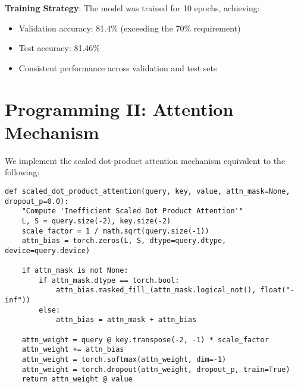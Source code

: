 \documentclass[11pt, a4paper, oneside]{memoir}
\begin{document}
\textbf{Training Strategy}: The model was trained for 10 epochs, achieving:
\begin{itemize}
    \item Validation accuracy: 81.4\% (exceeding the 70\% requirement)
    \item Test accuracy: 81.46\%
    \item Consistent performance across validation and test sets
\end{itemize}

\chapter{Programming II: Attention Mechanism}
We implement the scaled dot-product attention mechanism equivalent to the following:
\begin{verbatim}
def scaled_dot_product_attention(query, key, value, attn_mask=None, dropout_p=0.0):
    "Compute 'Inefficient Scaled Dot Product Attention'"
    L, S = query.size(-2), key.size(-2)
    scale_factor = 1 / math.sqrt(query.size(-1))
    attn_bias = torch.zeros(L, S, dtype=query.dtype, device=query.device)

    if attn_mask is not None:
        if attn_mask.dtype == torch.bool:
            attn_bias.masked_fill_(attn_mask.logical_not(), float("-inf"))
        else:
            attn_bias = attn_mask + attn_bias

    attn_weight = query @ key.transpose(-2, -1) * scale_factor
    attn_weight += attn_bias
    attn_weight = torch.softmax(attn_weight, dim=-1)
    attn_weight = torch.dropout(attn_weight, dropout_p, train=True)
    return attn_weight @ value
\end{verbatim}

\label{LastPage}
\end{document}
